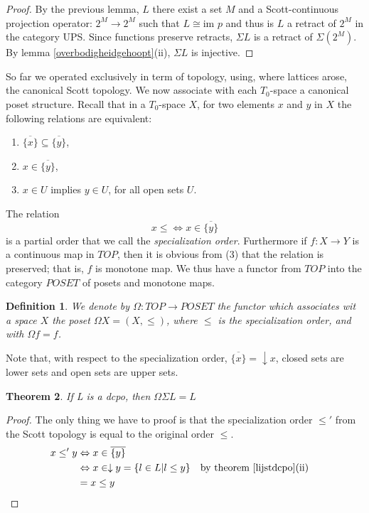 \documentclass[a4paper,12pt]{article}
\newtheorem{theorem}{Theorem}[section]
\newtheorem{definition}[theorem]{Definition}
\begin{document}
\begin{proof}
By the previous lemma, $L$ there exist a set $M$ and a Scott-continuous projection operator: $2^M \to 2^M$ such that $L \cong \text{im } p$ and thus is $L$ a retract of $2^M$ in the category UPS. Since functions preserve retracts, $\Sigma L$ is a retract of $\Sigma(2^M)$. By lemma \ref{overbodigheidgehoopt}(ii), $\Sigma L$ is injective.
\end{proof}

So far we operated exclusively in term of topology, using, where lattices arose, the canonical Scott topology. We now associate with each $T_0$-space a canonical poset structure. Recall that in a $T_0$-space $X$, for two elements $x$ and $y$ in $X$ the following relations are equivalent:
\begin{enumerate}
  \item $\overline{\{x\}} \subseteq \overline{\{y\}}$,
  \item $x \in \overline{\{y\}}$,
  \item $x \in U$ implies $y \in U$, for all open sets $U$.
\end{enumerate}
The relation
$$x \leq \iff x \in \overline{\{y\}}$$
is a partial order that we call the \emph{specialization order}. Furthermore if $f: X \to Y$ is a continuous map in $TOP$, then it is obvious from (3) that the relation is preserved; that is, $f$ is monotone map. We thus have a functor from $TOP$ into the category $POSET$ of posets and monotone maps.
\begin{definition}
We denote by $\Omega: TOP \to POSET$ the functor which associates wit a space $X$ the poset $\Omega X = (X, \leq)$, where $\leq$ is the specialization order, and with $\Omega f = f$.
\end{definition}
Note that, with respect to the specialization order, $\overline{\{x\}} = \downarrow x$, closed sets are lower sets and open sets are upper sets. 
\begin{theorem}\label{gel}
If L is a dcpo, then $\Omega\Sigma L = L$ 
\end{theorem}
\begin{proof}
The only thing we have to proof is that the specialization order $\leq'$ from the Scott topology is equal to the original order $\leq$.
\begin{align*}
x \leq' y &\Leftrightarrow x \in \overline{\{y\}} &\\
&\Leftrightarrow x \in \downarrow y = \{l \in L | l \leq y\} & &\text{by theorem \ref{lijstdcpo}(ii)}\\
&= x \leq y& &
\end{align*}
\end{proof}
\end{document}
